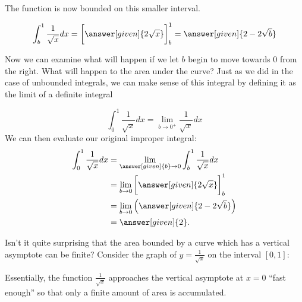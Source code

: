\documentclass{ximera}
\begin{document}
\begin{example}
\begin{explanation}
The function is now bounded on this smaller interval. 

\[
\int_{b}^1 \frac{1}{\sqrt{x}} dx=  \bigg[\answer[given]{2\sqrt{x}}\bigg]_b^1=\answer[given]{2-2\sqrt{b}}
\]

Now we can examine what will happen if we let $b$ begin to move towards $0$ from the right. What will happen to the area under the curve? 
Just as we did in the case of unbounded integrals, we can make sense of this integral by defining it as the limit of a definite integral 

\[
\int_{0}^{1} \frac{1}{\sqrt{x}} dx=\lim_{b \to 0^{+}} \frac{1}{\sqrt{x}} dx
\]
We can then evaluate our original improper integral: 
    \begin{align*}
      \int_{0}^1 \frac{1}{\sqrt{x}} dx &= \lim_{\answer[given]{b} \to 0} \int_{b}^1 \frac{1}{\sqrt{x}} dx \\
      &=  \lim_{b \to 0}  \bigg[\answer[given]{2\sqrt{x}}\bigg]_b^1 \\
      &=  \lim_{b \to 0} \left(\answer[given]{2-2\sqrt{b}}\right)\\
      &= \answer[given]{2}.
    \end{align*}

Isn't it quite surprising that the area bounded by a curve which has a
vertical asymptote can be finite? Consider the graph of $y=
\frac{1}{\sqrt{x}}$ on the interval $[0,1]$:

\begin{image}
\end{image}

Essentially, the function $\frac{1}{\sqrt{x}}$ approaches the vertical asymptote at $x=0$ ``fast enough'' so that only a finite amount of area is accumulated. 

  \end{explanation}
\end{example}
\end{document}
